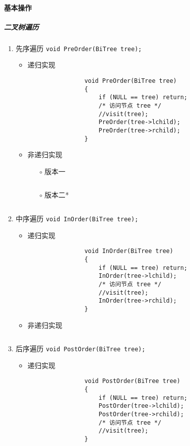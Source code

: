 \documentclass{ctexart}
\begin{document}
\paragraph{基本操作}
\subparagraph{二叉树遍历}
\begin{enumerate}
    \item 先序遍历 \texttt{void PreOrder(BiTree tree);}
        \begin{itemize}
            \item 递归实现
                \begin{verbatim}
                void PreOrder(BiTree tree)
                {
                    if (NULL == tree) return;
                    /* 访问节点 tree */
                    //visit(tree);
                    PreOrder(tree->lchild);
                    PreOrder(tree->rchild);
                }
                \end{verbatim}
            \item 非递归实现
                \begin{itemize}
                    \item[$\circ$] 版本一
                        \inputminted{c}{codes/preorder-of-bitree-without-recursion1.c}
                    \item[$\circ$] 版本二*
                        \inputminted{c}{codes/preorder-of-bitree-without-recursion2.c}
                \end{itemize}
        \end{itemize}

    \item 中序遍历 \texttt{void InOrder(BiTree tree);}
        \begin{itemize}
            \item 递归实现
                \begin{verbatim}
                void InOrder(BiTree tree)
                {
                    if (NULL == tree) return;
                    InOrder(tree->lchild);
                    /* 访问节点 tree */
                    //visit(tree);
                    InOrder(tree->rchild);
                }
                \end{verbatim}

            \item 非递归实现
                \inputminted{c}{codes/inorder-of-bitree-without-recursion.c}

        \end{itemize}

    \item 后序遍历 \texttt{void PostOrder(BiTree tree);}
        \begin{itemize}
            \item 递归实现
                \begin{verbatim}
                void PostOrder(BiTree tree)
                {
                    if (NULL == tree) return;
                    PostOrder(tree->lchild);
                    PostOrder(tree->rchild);
                    /* 访问节点 tree */
                    //visit(tree);
                }
                \end{verbatim}


\end{itemize}
\end{enumerate}
\end{document}

